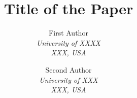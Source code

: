 \documentclass[10pt,twocolumn,letterpaper]{article}
\begin{document}
\title{Title of the Paper}

\author{First Author\\
\textit{\small University of XXXX}\\
\textit{\small XXX, USA}
\and
Second Author\\
\textit{\small University of XXX}\\
\textit{\small XXX, USA}
}
\maketitle








\newpage
{\small


}
\end{document}
